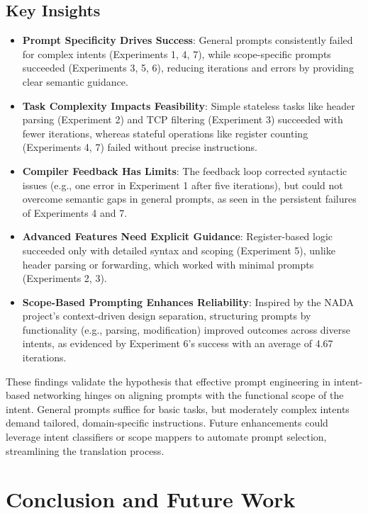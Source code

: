 \documentclass[sigconf]{acmart}
\begin{document}
\subsection*{Key Insights}
\begin{itemize}
    \item \textbf{Prompt Specificity Drives Success}: General prompts consistently failed for complex intents (Experiments 1, 4, 7), while scope-specific prompts succeeded (Experiments 3, 5, 6), reducing iterations and errors by providing clear semantic guidance.
    \item \textbf{Task Complexity Impacts Feasibility}: Simple stateless tasks like header parsing (Experiment 2) and TCP filtering (Experiment 3) succeeded with fewer iterations, whereas stateful operations like register counting (Experiments 4, 7) failed without precise instructions.
    \item \textbf{Compiler Feedback Has Limits}: The feedback loop corrected syntactic issues (e.g., one error in Experiment 1 after five iterations), but could not overcome semantic gaps in general prompts, as seen in the persistent failures of Experiments 4 and 7.
    \item \textbf{Advanced Features Need Explicit Guidance}: Register-based logic succeeded only with detailed syntax and scoping (Experiment 5), unlike header parsing or forwarding, which worked with minimal prompts (Experiments 2, 3).
    \item \textbf{Scope-Based Prompting Enhances Reliability}: Inspired by the NADA project’s context-driven design separation, structuring prompts by functionality (e.g., parsing, modification) improved outcomes across diverse intents, as evidenced by Experiment 6’s success with an average of 4.67 iterations.
\end{itemize}

These findings validate the hypothesis that effective prompt engineering in intent-based networking hinges on aligning prompts with the functional scope of the intent. General prompts suffice for basic tasks, but moderately complex intents demand tailored, domain-specific instructions. Future enhancements could leverage intent classifiers or scope mappers to automate prompt selection, streamlining the translation process.

\section{Conclusion and Future Work}
\end{document}
